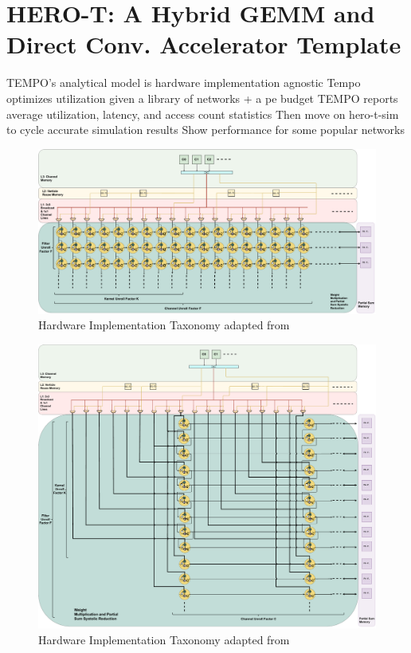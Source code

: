 \section{HERO-T: A Hybrid GEMM and Direct Conv. Accelerator Template}
\label{chap:hero}

TEMPO's analytical model is hardware implementation agnostic
Tempo optimizes utilization given a library of networks + a pe budget
TEMPO reports average utilization, latency, and access count 
statistics
Then move on hero-t-sim to cycle accurate simulation results
Show performance for some popular networks

\begin{figure}[ht]
    \centering
    \includegraphics[scale=0.58]{fig/hero-t-horizontal.pdf}
    \caption{Hardware Implementation Taxonomy adapted from \cite{maestro}}
    \label{fig:hw_taxonomy}
\end{figure}

\begin{figure}[ht]
    \centering
    \includegraphics[scale=0.58]{fig/hero-t-verticle.pdf}
    \caption{Hardware Implementation Taxonomy adapted from \cite{maestro}}
    \label{fig:hw_taxonomy}
\end{figure}



